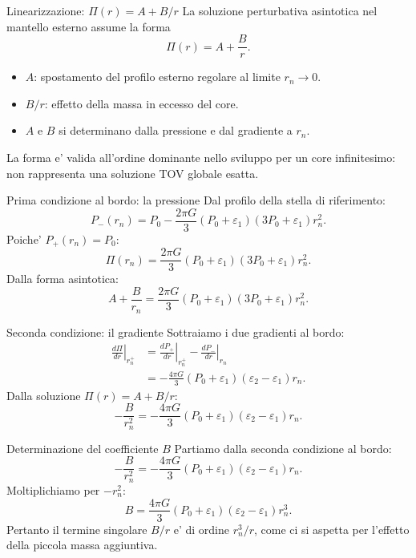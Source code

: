 \begin{frame}{Linearizzazione: $\Pi(r)=A+B/r$}
\small
La soluzione perturbativa asintotica nel mantello esterno assume la forma
\[
{\Pi(r)=A+\frac{B}{r}.}
\]
\begin{itemize}
\item $A$: spostamento del profilo esterno regolare al limite $r_n\to0$.
\item $B/r$: effetto della massa in eccesso del core.
\item $A$ e $B$ si determinano dalla pressione e dal gradiente a $r_n$.
\end{itemize}
La forma e' valida all'ordine dominante nello sviluppo per un core
infinitesimo: non rappresenta una soluzione TOV globale esatta.
\end{frame}

\begin{frame}{Prima condizione al bordo: la pressione}
\small
Dal profilo della stella di riferimento:
\[
P_-(r_n)=P_0-
\frac{2\pi G}{3}(P_0+\varepsilon_1)
(3P_0+\varepsilon_1)r_n^2.
\]
Poiche' $P_+(r_n)=P_0$:
\[
\Pi(r_n)=\frac{2\pi G}{3}(P_0+\varepsilon_1)
(3P_0+\varepsilon_1)r_n^2.
\]
Dalla forma asintotica:
\[
{A+\frac{B}{r_n}=
\frac{2\pi G}{3}(P_0+\varepsilon_1)
(3P_0+\varepsilon_1)r_n^2.}
\]
\end{frame}

\begin{frame}{Seconda condizione: il gradiente}
\small
Sottraiamo i due gradienti al bordo:
\[
\begin{aligned}
\left.\frac{d\Pi}{dr}\right|_{r_n^+}
&=\left.\frac{dP_+}{dr}\right|_{r_n^+}
-\left.\frac{dP_-}{dr}\right|_{r_n}\\
&=-\frac{4\pi G}{3}(P_0+\varepsilon_1)
(\varepsilon_2-\varepsilon_1)r_n.
\end{aligned}
\]
Dalla soluzione $\Pi(r)=A+B/r$:
\[
{-\frac{B}{r_n^2}=
-\frac{4\pi G}{3}(P_0+\varepsilon_1)
(\varepsilon_2-\varepsilon_1)r_n.}
\]
\end{frame}

\begin{frame}{Determinazione del coefficiente $B$}
\small
Partiamo dalla seconda condizione al bordo:
\[
-\frac{B}{r_n^2}=-\frac{4\pi G}{3}
(P_0+\varepsilon_1)(\varepsilon_2-\varepsilon_1)r_n.
\]
Moltiplichiamo per $-r_n^2$:
\[
{B=\frac{4\pi G}{3}
(P_0+\varepsilon_1)(\varepsilon_2-\varepsilon_1)r_n^3.}
\]
Pertanto il termine singolare $B/r$ e' di ordine $r_n^3/r$,
come ci si aspetta per l'effetto della piccola massa aggiuntiva.
\end{frame}

